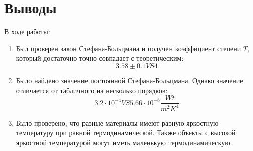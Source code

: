 \documentclass{article}
\begin{document}
\section{Выводы}
В ходе работы:
\begin{enumerate}
\item Был проверен закон Стефана-Больцмана и получен коэффициент степени \(T\), который достаточно точно совпадает с теоретическим:
	\[ 3.58 \pm 0.1 VS 4 \]
\item Было найдено значение постоянной Стефана-Больцмана. Однако значение отличается от табличного на несколько порядков:
	\[ 3.2\cdot 10^{-4} VS 5.66\cdot 10^{-8} \frac{Wt}{m^2K^4} \]
\item Было проверено, что разные материалы имеют разную яркостную температуру при равной термодинамической.
	Также объекты с высокой яркостной температурой могут иметь маленькую термодинамическую.
\end{enumerate}
\end{document}
